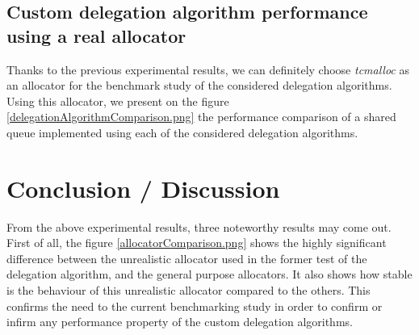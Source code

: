 \documentclass[10pt]{article}											%
\begin{document}
\subsection{Custom delegation algorithm performance using a real allocator}
Thanks to the previous experimental results, we can definitely choose \textit{tcmalloc} as an allocator for the benchmark study of the considered delegation algorithms.\\
Using this allocator, we present on the figure \ref{delegationAlgorithmComparison.png} the performance comparison of a shared queue implemented using each of the considered delegation algorithms.

\begin{figure*}[!htb]\centering
	\begin{minipage}{0.35\textwidth}
        \caption{Intel Xeon E5 2620}
	\end{minipage}
	\begin{minipage}{0.35\textwidth}
		\caption{AMD Opteron 6164 HE}
	\end{minipage}
	\caption{Delegation algorithm comparison using the tcmalloc allocator. cc-msqueue:  shared queue implemented using the combiner algorithm.   mp-msqueue-2: shared queue implemented using the backoff/streaming delegation algorithm}
	\label{delegationAlgorithmComparison.png}
\end{figure*}




\section{Conclusion / Discussion}
From the above experimental results, three noteworthy results may come out.\\
First of all, the figure \ref{allocatorComparison.png} shows the highly significant difference between the unrealistic allocator used in the former test of the delegation algorithm, and the general purpose allocators.   It also shows how stable is the behaviour of this unrealistic allocator compared to the others.   This confirms the need to the current benchmarking study in order to confirm or infirm any performance property of the custom delegation algorithms.\\
\end{document}
